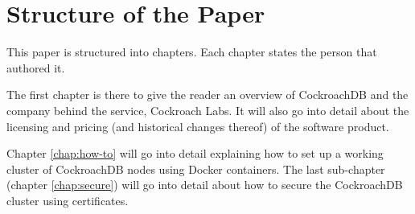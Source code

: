 \section*{Structure of the Paper}
This paper is structured into  chapters. Each chapter states the person that authored it.

\medskip
The first chapter is there to give the reader an overview of CockroachDB and the company behind the service, Cockroach Labs. It will also go into detail about the licensing and pricing (and historical changes thereof) of the software product.


\bigskip
Chapter \ref{chap:how-to} will go into detail explaining how to set up a working cluster of CockroachDB nodes using Docker containers. The last sub-chapter (chapter \ref{chap:secure}) will go into detail about how to secure the CockroachDB cluster using certificates.
